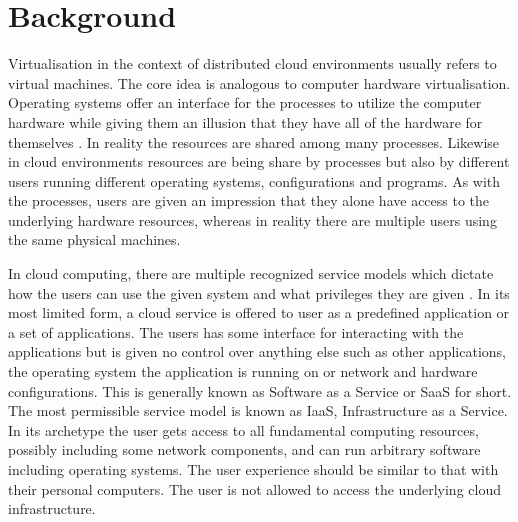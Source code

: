 \section{Background}

Virtualisation in the context of distributed cloud environments usually refers to virtual machines. The core idea is analogous to computer hardware virtualisation. Operating systems offer an interface for the processes to utilize the computer hardware while giving them an illusion that they have all of the hardware for themselves \cite{ArpaciDusseau14-Book}. In reality the resources are shared among many processes. Likewise in cloud environments resources are being share by processes but also by different users running different operating systems, configurations and programs. As with the processes, users are given an impression that they alone have access to the underlying hardware resources, whereas in reality there are multiple users using the same physical machines.
	
			In cloud computing, there are multiple recognized service models which dictate how the users can use the given system and what privileges they are given \cite{Mell:2011:SND:2206223}. In its most limited form, a cloud service is offered to user as a predefined application or a set of applications. The users has some interface for interacting with the applications but is given no control over anything else such as other applications, the operating system the application is running on or network and hardware configurations. This is generally known as Software as a Service or SaaS for short. The most permissible service model is known as IaaS, Infrastructure as a Service. In its archetype the user gets access to all fundamental computing resources, possibly including some network components, and can run arbitrary software including operating systems. The user experience should be similar to that with their personal computers. The user is not allowed to access the underlying cloud infrastructure. 
